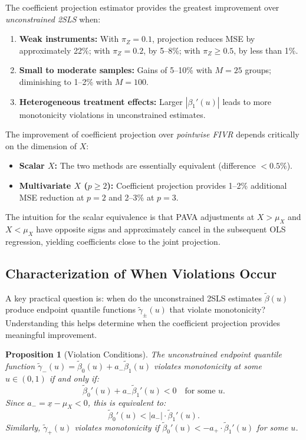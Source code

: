 \documentclass[12pt]{article}
\newcommand{\xbar}{\underline{x}}
\newtheorem{proposition}{Proposition}
\begin{document}
The coefficient projection estimator provides the greatest improvement over \emph{unconstrained 2SLS} when:

\begin{enumerate}
\item \textbf{Weak instruments:} With $\pi_Z = 0.1$, projection reduces MSE by approximately 22\%; with $\pi_Z = 0.2$, by 5--8\%; with $\pi_Z \geq 0.5$, by less than 1\%.
\item \textbf{Small to moderate samples:} Gains of 5--10\% with $M = 25$ groups; diminishing to 1--2\% with $M = 100$.
\item \textbf{Heterogeneous treatment effects:} Larger $|\beta_1'(u)|$ leads to more monotonicity violations in unconstrained estimates.
\end{enumerate}

The improvement of coefficient projection over \emph{pointwise FIVR} depends critically on the dimension of $X$:
\begin{itemize}
\item \textbf{Scalar $X$:} The two methods are essentially equivalent (difference $<0.5\%$).
\item \textbf{Multivariate $X$ ($p \geq 2$):} Coefficient projection provides 1--2\% additional MSE reduction at $p=2$ and 2--3\% at $p=3$.
\end{itemize}

The intuition for the scalar equivalence is that PAVA adjustments at $X > \mu_X$ and $X < \mu_X$ have opposite signs and approximately cancel in the subsequent OLS regression, yielding coefficients close to the joint projection.

\subsection{Characterization of When Violations Occur}

A key practical question is: when do the unconstrained 2SLS estimates $\tilde{\beta}(u)$ produce endpoint quantile functions $\tilde{\gamma}_\pm(u)$ that violate monotonicity? Understanding this helps determine when the coefficient projection provides meaningful improvement.

\begin{proposition}[Violation Conditions]\label{prop:violations}
The unconstrained endpoint quantile function $\tilde{\gamma}_-(u) = \tilde{\beta}_0(u) + a_- \tilde{\beta}_1(u)$ violates monotonicity at some $u \in (0,1)$ if and only if:
\begin{equation}
\tilde{\beta}_0'(u) + a_- \tilde{\beta}_1'(u) < 0 \quad \text{for some } u.
\end{equation}
Since $a_- = \xbar - \mu_X < 0$, this is equivalent to:
\begin{equation}
\tilde{\beta}_0'(u) < |a_-| \cdot \tilde{\beta}_1'(u).
\end{equation}
Similarly, $\tilde{\gamma}_+(u)$ violates monotonicity if $\tilde{\beta}_0'(u) < -a_+ \cdot \tilde{\beta}_1'(u)$ for some $u$.
\end{proposition}
\end{document}
